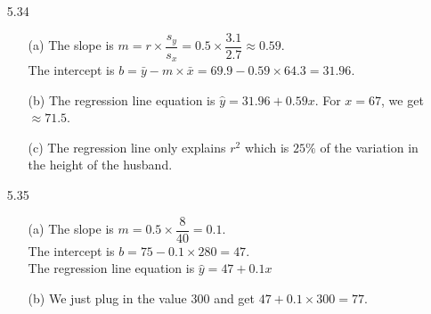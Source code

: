 \documentclass[11pt, a4paper]{article}
\begin{document}
\begin{itemize}
\item[]
\item[]

\item[5.34]
\begin{itemize}
\item[(a)]
The slope is $m = r \times \dfrac{s_y}{s_x} = 0.5 \times \dfrac{3.1}{2.7} \approx 0.59$.\\
The intercept is $b = \bar{y} - m \times \bar{x} = 69.9 - 0.59 \times 64.3 = 31.96$.
\item[]

\item[(b)]
The regression line equation is $\hat{y} = 31.96 + 0.59x$.
For $x = 67$, we get $\approx 71.5$.
\item[]
\item[]
\begin{center}
\end{center}
\item[]
\item[]

\item[]

\item[(c)]
The regression line only explains $r^2$ which is $25\%$ of the variation in the height of the husband.
\end{itemize}

\item[]
\item[]

\item[5.35]
\begin{itemize}
\item[(a)]
The slope is $m = 0.5 \times \dfrac{8}{40} = 0.1$.\\
The intercept is $b = 75 - 0.1 \times 280 = 47$.\\
The regression line equation is $\hat{y} = 47 + 0.1x$

\item[]

\item[(b)]
We just plug in the value 300 and get $47 + 0.1 \times 300 = 77$.


\end{itemize}
\end{itemize}
\end{document}
